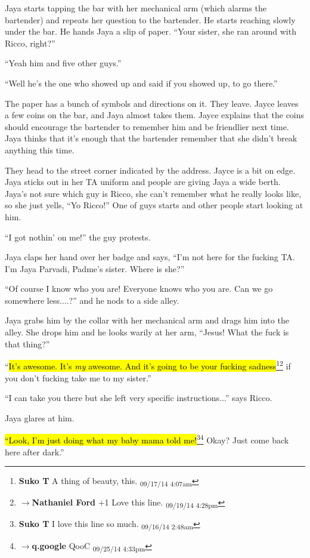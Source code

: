 Jaya starts tapping the bar with her mechanical arm (which alarms the bartender) and repeats her question to the bartender.  He starts reaching slowly under the bar.  He hands Jaya a slip of paper.  ``Your sister, she ran around with Ricco, right?''

``Yeah him and five other guys.''

``Well he's the one who showed up and said if you showed up, to go there.''

The paper has a bunch of symbols and directions on it.  They leave.  Jayce leaves a few coins on the bar, and Jaya almost takes them.  Jayce explains that the coins should encourage the bartender to remember him and be friendlier next time.  Jaya thinks that it's enough that the bartender remember that she didn't break anything this time.



They head to the street corner indicated by the address.  Jayce is a bit on edge.  Jaya sticks out in her TA uniform and people are giving Jaya a wide berth.  Jaya's not sure which guy is Ricco, she can't remember what he really looks like, so she just yells, ``Yo Ricco!''  One of guys starts and other people start looking at him.

``I got nothin' on me!'' the guy protests.

Jaya claps her hand over her badge and says, ``I'm not here for the fucking TA. I'm Jaya Parvadi, Padme's sister.  Where is she?''

``Of course I know who you are!  Everyone knows who you are.  Can we go somewhere less....?'' and he nods to a side alley.

Jaya grabs him by the collar with her mechanical arm and drags him into the alley.  She drops him and he looks warily at her arm, ``Jesus! What the fuck is that thing?''

``\hl{It's awesome.  It's \textit{my} awesome.  And it's going to be your fucking sadness}\footnote{\textbf{Suko T }A thing of beauty, this. \textsubscript{09/17/14 4:07am}}\footnote{$\rightarrow$\textbf{Nathaniel Ford }+1 Love this line. \textsubscript{09/19/14 4:28pm}} if you don't fucking take me to my sister.''

``I can take you there but she left very specific instructions...'' says Ricco.

Jaya glares at him.

\hl{``Look, I'm just doing what my baby mama told me!}\footnote{\textbf{Suko T }I love this line so much. \textsubscript{09/16/14 2:48am}}\footnote{$\rightarrow$\textbf{q.google }QooC \textsubscript{09/25/14 4:33pm}}  Okay?  Just come back here after dark.''

